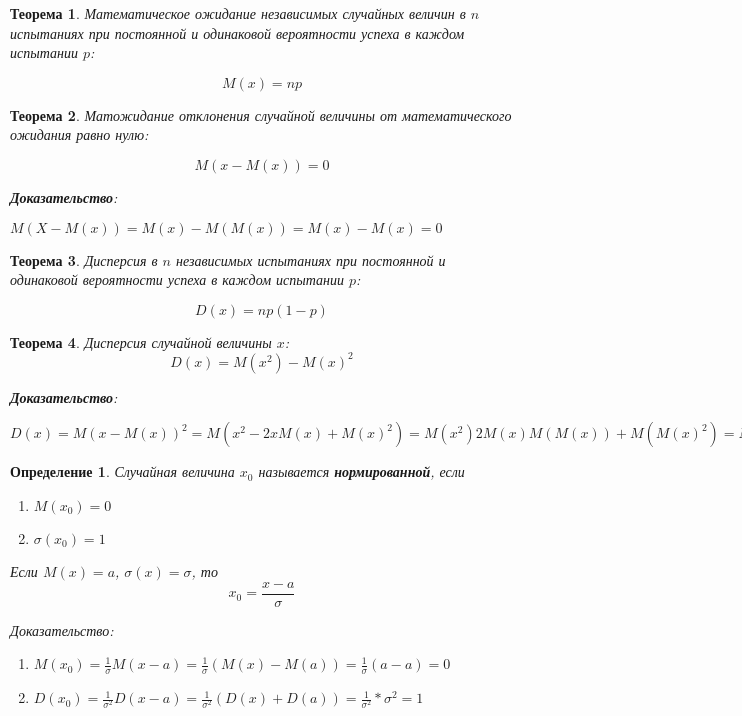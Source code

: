 \documentclass{article}
\newtheorem{definition}{Определение}
\newtheorem{theorem}{Теорема}
\begin{document}
\begin{theorem}
    Математическое ожидание независимых случайных величин в $n$ испытаниях при постоянной и одинаковой вероятности успеха в каждом испытании $p$:

    $$M(x) = np$$
\end{theorem}

\begin{theorem}
    Матожидание отклонения случайной величины от математического ожидания равно нулю:

    $$M(x - M(x)) = 0$$

    \textbf{Доказательство}:

    $M(X - M(x)) = M(x) - M(M(x)) = M(x) - M(x) = 0$
\end{theorem}

\begin{theorem}
    Дисперсия в $n$ независимых испытаниях при постоянной и одинаковой вероятности успеха в каждом испытании $p$:

    $$D(x) = np(1-p)$$
\end{theorem}

\begin{theorem}
    Дисперсия случайной величины $x$:
    $$D(x) = M(x^2) - M(x)^2$$

    \textbf{Доказательство}:

    $D(x) = M(x - M(x))^2 = M(x^2 - 2xM(x) + M(x)^2) = M(x^2) 2 M(x) M(M(x)) + M(M(x)^2) = M(x^2) - M(x)^2$
\end{theorem}

\begin{definition}
    Случайная величина $x_0$ называется \textbf{нормированной}, если
    
    \begin{enumerate}
        \item $M(x_0) = 0$
        \item $\sigma(x_0) = 1$
    \end{enumerate}

    Если $M(x) = a$, $\sigma(x) = \sigma$, то $$x_{0} = \frac{x - a}{\sigma}$$

    Доказательство:
    
    \begin{enumerate}
        \item $M(x_0) = \frac{1}{\sigma} M(x - a) = \frac{1}{\sigma} (M(x) - M(a)) = \frac{1}{\sigma} (a - a) = 0$
        \item $D(x_0) = \frac{1}{\sigma^2} D(x - a) = \frac{1}{\sigma^2} (D(x) + D(a)) = \frac{1}{\sigma^2} * \sigma^2 = 1$
    \end{enumerate}
\end{definition}
\end{document}
